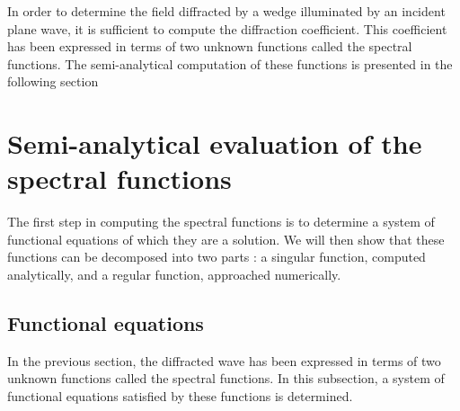 In order to determine the field diffracted by a wedge illuminated by an incident plane wave, it is sufficient to compute the diffraction coefficient. This coefficient has been expressed in terms of two unknown functions called the spectral functions. The semi-analytical computation of these functions is presented in the following section

\section{Semi-analytical evaluation of the spectral functions}
\label{section4}
The first step in computing the spectral functions is to determine a system of functional equations of which they are a solution. We will then show that these functions can be decomposed into two parts : a singular function, computed analytically, and a regular function, approached numerically.
\subsection{Functional equations}
In the previous section, the diffracted wave has been expressed in terms of two unknown functions called the spectral functions. In this subsection, a system of functional equations satisfied by these functions is determined.

